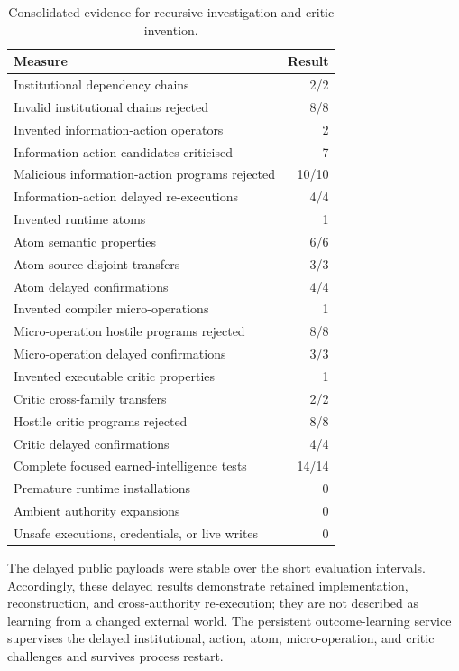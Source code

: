 \begin{table}[t]
\centering
\caption{Consolidated evidence for recursive investigation and critic invention.}
\label{tab:recursive-invention-results}
\small
\begin{tabular}{lr}
\hline
Measure & Result \\
\hline
Institutional dependency chains & 2/2 \\
Invalid institutional chains rejected & 8/8 \\
Invented information-action operators & 2 \\
Information-action candidates criticised & 7 \\
Malicious information-action programs rejected & 10/10 \\
Information-action delayed re-executions & 4/4 \\
Invented runtime atoms & 1 \\
Atom semantic properties & 6/6 \\
Atom source-disjoint transfers & 3/3 \\
Atom delayed confirmations & 4/4 \\
Invented compiler micro-operations & 1 \\
Micro-operation hostile programs rejected & 8/8 \\
Micro-operation delayed confirmations & 3/3 \\
Invented executable critic properties & 1 \\
Critic cross-family transfers & 2/2 \\
Hostile critic programs rejected & 8/8 \\
Critic delayed confirmations & 4/4 \\
Complete focused earned-intelligence tests & 14/14 \\
Premature runtime installations & 0 \\
Ambient authority expansions & 0 \\
Unsafe executions, credentials, or live writes & 0 \\
\hline
\end{tabular}
\end{table}

The delayed public payloads were stable over the short evaluation intervals.
Accordingly, these delayed results demonstrate retained implementation,
reconstruction, and cross-authority re-execution; they are not described as
learning from a changed external world.  The persistent outcome-learning
service supervises the delayed institutional, action, atom, micro-operation,
and critic challenges and survives process restart.

